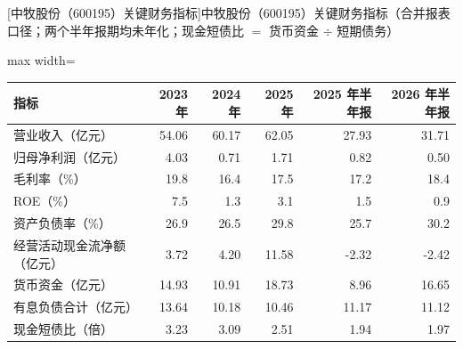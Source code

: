 \begin{center}\small\setlength{\tabcolsep}{3.4pt}
[中牧股份（600195）关键财务指标]{中牧股份（600195）关键财务指标（合并报表口径；两个半年报期均未年化；现金短债比 $=$ 货币资金 $\div$ 短期债务）}
\begin{adjustbox}{max width=\textwidth}
\begin{tabular}{@{}lrrrrr@{}}
\toprule
指标 & 2023 年 & 2024 年 & 2025 年 & 2025 年半年报 & 2026 年半年报 \\
\midrule
营业收入（亿元） & 54.06 & 60.17 & 62.05 & 27.93 & 31.71 \\
归母净利润（亿元） & 4.03 & 0.71 & 1.71 & 0.82 & 0.50 \\
毛利率（\%） & 19.8 & 16.4 & 17.5 & 17.2 & 18.4 \\
ROE（\%） & 7.5 & 1.3 & 3.1 & 1.5 & 0.9 \\
资产负债率（\%） & 26.9 & 26.5 & 29.8 & 25.7 & 30.2 \\
经营活动现金流净额（亿元） & 3.72 & 4.20 & 11.58 & -2.32 & -2.42 \\
货币资金（亿元） & 14.93 & 10.91 & 18.73 & 8.96 & 16.65 \\
有息负债合计（亿元） & 13.64 & 10.18 & 10.46 & 11.17 & 11.12 \\
现金短债比（倍） & 3.23 & 3.09 & 2.51 & 1.94 & 1.97 \\
\bottomrule
\end{tabular}
\end{adjustbox}
\end{center}

